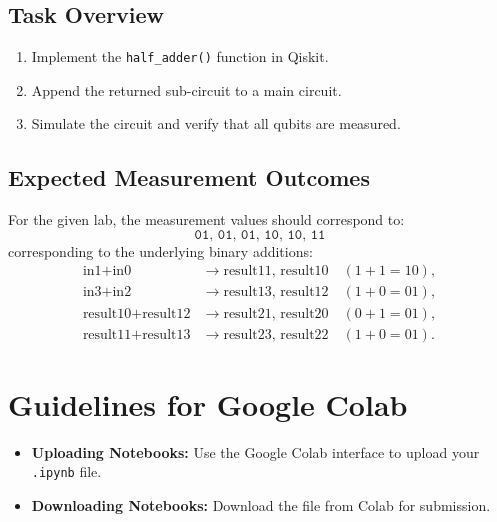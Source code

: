 \documentclass[12pt]{book}
\theoremstyle{remark}
\begin{document}
	\subsection{Task Overview}
	\begin{enumerate}
		\item Implement the \texttt{half\_adder()} function in Qiskit.
		\item Append the returned sub-circuit to a main circuit.
		\item Simulate the circuit and verify that all qubits are measured.
	\end{enumerate}
	
	\subsection{Expected Measurement Outcomes}
	For the given lab, the measurement values should correspond to:
	\[
	\texttt{01, 01, 01, 10, 10, 11}
	\]
	corresponding to the underlying binary additions:
	\[
	\begin{aligned}
		\text{in1} + \text{in0} &\to \text{result11, result10} \quad (1+1=10),\\[1mm]
		\text{in3} + \text{in2} &\to \text{result13, result12} \quad (1+0=01),\\[1mm]
		\text{result10} + \text{result12} &\to \text{result21, result20} \quad (0+1=01),\\[1mm]
		\text{result11} + \text{result13} &\to \text{result23, result22} \quad (1+0=01).
	\end{aligned}
	\]
	
	\section{Guidelines for Google Colab}
	\begin{itemize}
		\item \textbf{Uploading Notebooks:} Use the Google Colab interface to upload your \texttt{.ipynb} file.
		\item \textbf{Downloading Notebooks:} Download the file from Colab for submission.
	\end{itemize}
	
\end{document}
